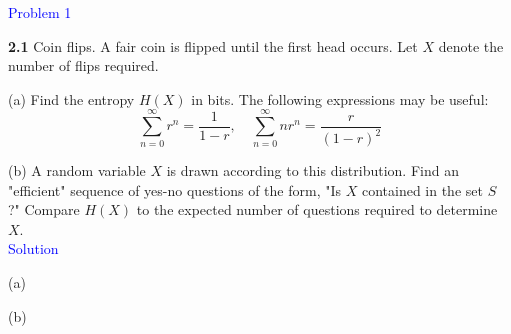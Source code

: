 \textcolor{blue}{Problem 1}

\textbf{2.1} Coin flips. A fair coin is flipped until the first head occurs. Let $X$ denote the number of flips required.

(a) Find the entropy $H(X)$ in bits. The following expressions may be useful:
$$\sum_{n=0}^{\infty} r^n=\frac{1}{1-r}, \quad \sum_{n=0}^{\infty} n r^n=\frac{r}{(1-r)^2}$$

(b) A random variable $X$ is drawn according to this distribution. Find an "efficient" sequence of yes-no questions of the form, "Is $X$ contained in the set $S$ ?" Compare $H(X)$ to the expected number of questions required to determine $X$. \\

\textcolor{blue}{Solution}

(a)




(b)







\newpage